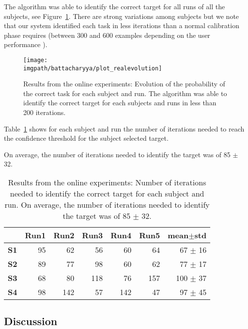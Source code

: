 The algorithm was able to identify the correct target for all runs of all the subjects, see Figure~\ref{fig:overlaponlineresults}. There are strong variations among subjects but we note that our system identified each task in less iterations than a normal calibration phase requires (between 300 and 600 examples depending on the user performance \cite{chavarriaga2010learning,iturrate2010single}).

\begin{figure}[!ht]
    \centering
    \texttt{[image: \\imgpath/battacharyya/plot\_realevolution]}    
    \caption{Results from the online experiments: Evolution of the probability of the correct task for each subject and run. The algorithm was able to identify the correct target for each subjects and runs in less than 200 iterations.}
    \label{fig:overlaponlineresults} 
\end{figure}

Table~\ref{tab:overlaponline} shows for each subject and run the number of iterations needed to reach the confidence threshold for the subject selected target.

On average, the number of iterations needed to identify the target was of 85 $\pm$ 32.

\begin{table}[!ht]
\centering
{}
\begin{footnotesize}
\begin{tabular}{r|rrrrr|r}
    & \textbf{Run1} & \textbf{Run2} & \textbf{Run3} & \textbf{Run4} & \textbf{Run5} & \textbf{mean$\pm$std} \\\hline
    \textbf{S1} & 95 & 62 & 56 & 60 & 64 & 67 $\pm$ 16 \\
    \textbf{S2} & 89 & 77 & 98 & 60 & 62  & 77 $\pm$ 17 \\
    \textbf{S3} & 68 & 80 & 118 & 76 & 157 & 100 $\pm$ 37 \\
    \textbf{S4} & 98 & 142 & 57 & 142 & 47 & 97 $\pm$ 45 \\
\end{tabular}
\end{footnotesize}
  \caption{Results from the online experiments: Number of iterations needed to identify the correct target for each subject and run. On average, the number of iterations needed to identify the target was of 85 $\pm$ 32.}
  \label{tab:overlaponline}
\end{table}

\subsection{Discussion}


